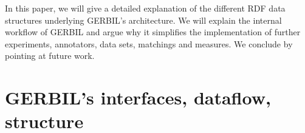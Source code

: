 
In this paper, we will give a detailed explanation of the different RDF data structures underlying GERBIL's architecture.
We will explain the internal workflow of GERBIL and argue why it simplifies the implementation of further experiments, annotators, data sets, matchings and measures.
We conclude by pointing at future work.



\section{GERBIL's interfaces, dataflow, structure}
\label{cha334:sec:architecture}

